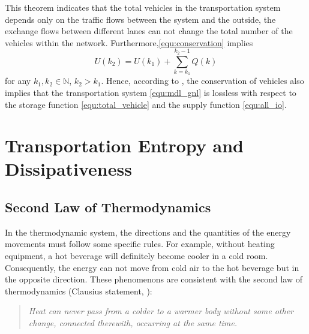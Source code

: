\documentclass[preprint,authoryear,12pt]{elsarticle}
\begin{document}
This theorem indicates that the total vehicles in the transportation system depends only on the traffic flows between the system and the outside, the exchange flows between different lanes can not change the total number of the vehicles within the network. Furthermore,\eqref{equ:conservation} implies
\begin{equation}\label{equ:conservation_ex}
U(k_2) = U(k_1)+\sum_{k=k_1}^{k_2-1}Q(k)
\end{equation}
for any $k_1,k_2\in\mathbb{N}$, $k_2>k_1$. Hence, according to \citep{willems_dissipative_1972-1}, the conservation of vehicles also implies that the transportation system \eqref{equ:mdl_gnl} is lossless with respect to the storage function \eqref{equ:total_vehicle} and the supply function \eqref{equ:all_io}.

\section{Transportation Entropy and Dissipativeness}

\subsection{Second Law of Thermodynamics}

In the thermodynamic system, the directions and the quantities of the energy movements must follow some specific rules. For example, without heating equipment, a hot beverage will definitely become cooler in a cold room. Consequently, the energy can not move from cold air to the hot beverage but in the opposite direction. These phenomenons are consistent with the second law of thermodynamics (Clausius statement, \citet{clausius_mechanical_1867}):
\begin{quotation}
\it Heat can never pass from a colder to a warmer body without some other change, connected therewith, occurring at the same time.
\end{quotation}
\end{document}
